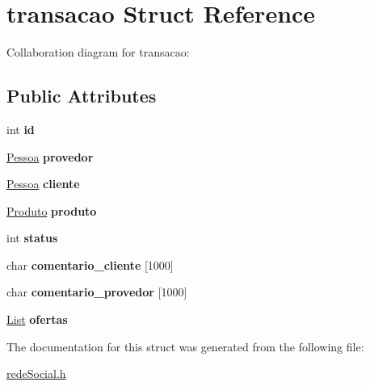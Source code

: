 \hypertarget{structtransacao}{}\section{transacao Struct Reference}
\label{structtransacao}


Collaboration diagram for transacao\+:
\subsection*{Public Attributes}
\begin{DoxyCompactItemize}
\item 
\mbox{\label{structtransacao_aa4136876fb27948aedaf0dfb35e6b4ec}} 
int {\bfseries id}
\item 
\mbox{\label{structtransacao_ae8932bd1de3dd41906f357310aa1a3b4}} 
\hyperlink{structpessoa}{Pessoa} {\bfseries provedor}
\item 
\mbox{\label{structtransacao_a35f236c864743a8224cdcc4ef08875bf}} 
\hyperlink{structpessoa}{Pessoa} {\bfseries cliente}
\item 
\mbox{\label{structtransacao_a711d494042bf522088f3f25fc7299a21}} 
\hyperlink{structproduto}{Produto} {\bfseries produto}
\item 
\mbox{\label{structtransacao_ad1859124a1c74c98a285e73e2ef53ba5}} 
int {\bfseries status}
\item 
\mbox{\label{structtransacao_a1d863f578f35716ea5e7fade6814fc42}} 
char {\bfseries comentario\+\_\+cliente} \mbox{[}1000\mbox{]}
\item 
\mbox{\label{structtransacao_a7a0227cacf8430fe32e55048e35ca302}} 
char {\bfseries comentario\+\_\+provedor} \mbox{[}1000\mbox{]}
\item 
\mbox{\label{structtransacao_acbb11d435f016382611f086217b740ad}} 
\hyperlink{lista_8h_a698ff83165b8296011a50bb9aba83964}{List} {\bfseries ofertas}
\end{DoxyCompactItemize}


The documentation for this struct was generated from the following file\+:\begin{DoxyCompactItemize}
\item 
\hyperlink{rede_social_8h}{rede\+Social.\+h}\end{DoxyCompactItemize}
